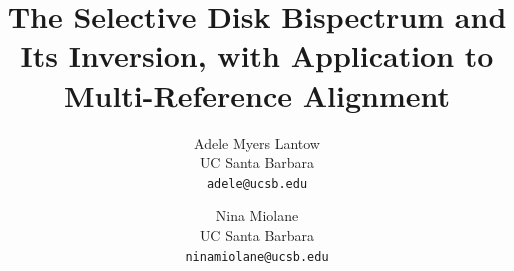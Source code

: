 \documentclass[10pt,twocolumn,letterpaper]{article}
\title{The Selective Disk Bispectrum and Its Inversion, with Application to Multi-Reference Alignment}
\author{Adele Myers Lantow\\
UC Santa Barbara\\
{\tt\small adele@ucsb.edu}
\and
Nina Miolane\\
UC Santa Barbara\\
{\tt\small ninamiolane@ucsb.edu}
}
\theoremstyle{definition}
\theoremstyle{remark}
\begin{document}
\maketitle








{
    \small
    
    
}

% 
\end{document}

